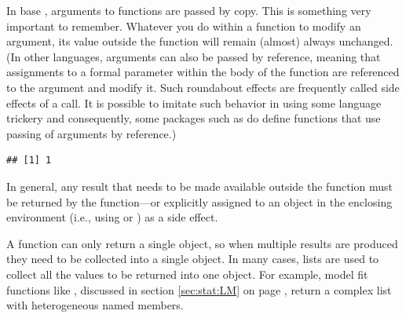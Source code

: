 \documentclass[krantz2]{krantz}\usepackage{knitr}
\begin{document}
\begin{warningbox}
In base \Rlang, arguments to functions are passed by copy. This is something very important to remember. Whatever you do within a function to modify an argument, its value outside the function will remain (almost) always unchanged. (In other languages, arguments can also be passed by reference, meaning that assignments to a formal parameter within the body of the function are referenced to the argument and modify it. Such roundabout effects are frequently called side effects of a call. It is possible to imitate such behavior in \Rlang using some language trickery and consequently, some packages such as  do define functions that use passing of arguments by reference.)

\begin{knitrout}\footnotesize
{}\color{fgcolor}\begin{kframe}
\begin{alltt}
 \hlkwb{<-} \hlstd{(} \hlkwb{<-} \hlstd{\}}
 \hlkwb{<-} 
\end{alltt}
\begin{verbatim}
## [1] 1
\end{verbatim}
\end{kframe}
\end{knitrout}

In general, any result that needs to be made available outside the function must be returned by the function---or explicitly assigned to an object in the enclosing environment (i.e., using \Roperator{<<-} or ) as a side effect.

A function can only return a single object, so when multiple results are produced they need to be collected into a single object. In many cases, lists are used to collect all the values to be returned into one \Rlang object. For example, model fit functions like , discussed in section \ref{sec:stat:LM} on page \pageref{sec:stat:LM}, return a complex list with heterogeneous named members.
\end{warningbox}
\end{document}
